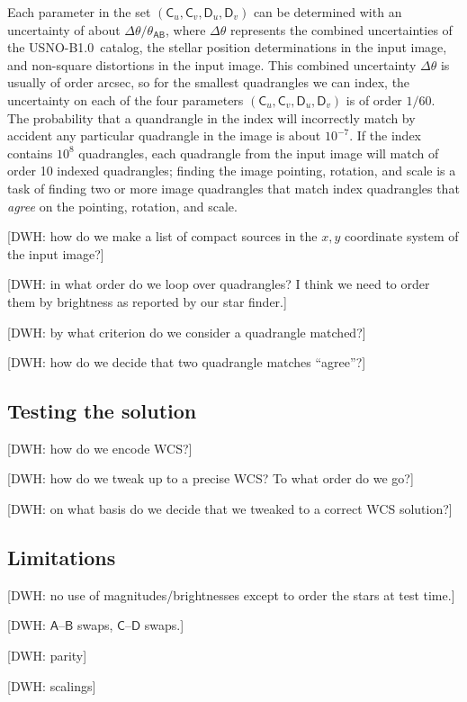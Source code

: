 \documentclass[12pt,preprint]{aastex}
\newcommand{\usnob}{USNO-B1.0}
\newcommand{\starlabel}[1]{\mathsf{#1}}
\newcommand{\AAA}{\starlabel{A}}
\newcommand{\BBB}{\starlabel{B}}
\newcommand{\CCC}{\starlabel{C}}
\newcommand{\DDD}{\starlabel{D}}
\newcommand{\thetaAB}{\theta_{\AAA\BBB}}
\begin{document}
Each parameter in the set $(\CCC_u,\CCC_v,\DDD_u,\DDD_v)$ can be
determined with an uncertainty of about $\Delta\theta/\thetaAB$, where
$\Delta\theta$ represents the combined uncertainties of the \usnob\
catalog, the stellar position determinations in the input image, and
non-square distortions in the input image.  This combined uncertainty
$\Delta\theta$ is usually of order arcsec, so for the smallest
quadrangles we can index, the uncertainty on each of the four
parameters $(\CCC_u,\CCC_v,\DDD_u,\DDD_v)$ is of order $1/60$.  The
probability that a quandrangle in the index will incorrectly match by
accident any particular quadrangle in the image is about $10^{-7}$.
If the index contains $10^8$ quadrangles, each quadrangle from the
input image will match of order 10 indexed quadrangles; finding the
image pointing, rotation, and scale is a task of finding two or more
image quadrangles that match index quadrangles that \emph{agree} on
the pointing, rotation, and scale.

[DWH: how do we make a list of compact sources in the $x,y$ coordinate
  system of the input image?]

[DWH: in what order do we loop over quadrangles?  I think we need to
  order them by brightness as reported by our star finder.]

[DWH: by what criterion do we consider a quadrangle matched?]

[DWH: how do we decide that two quadrangle matches ``agree''?]

\subsection{Testing the solution}

[DWH: how do we encode WCS?]

[DWH: how do we tweak up to a precise WCS?  To what order do we go?]

[DWH: on what basis do we decide that we tweaked to a correct WCS
  solution?]

\subsection{Limitations}

[DWH: no use of magnitudes/brightnesses except to order the stars at
  test time.]

[DWH: $\AAA$--$\BBB$ swaps, $\CCC$--$\DDD$ swaps.]

[DWH: parity]

[DWH: scalings]
\end{document}
